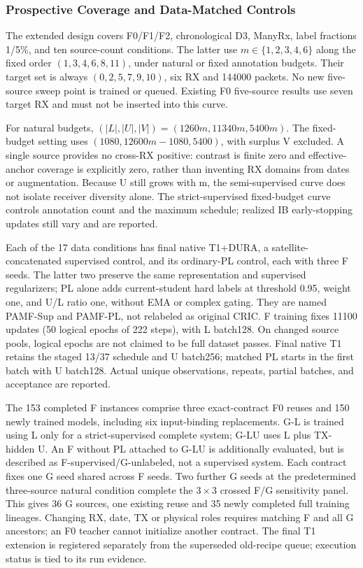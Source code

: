 \subsubsection{Prospective Coverage and Data-Matched Controls}
The extended design covers F0/F1/F2, chronological D3, ManyRx, label fractions 1/5\%, and ten source-count conditions. The latter use $m\in\{1,2,3,4,6\}$ along the fixed order $(1,3,4,6,8,11)$, under natural or fixed annotation budgets. Their target set is always $(0,2,5,7,9,10)$, six RX and 144000 packets. No new five-source sweep point is trained or queued. Existing F0 five-source results use seven target RX and must not be inserted into this curve.

For natural budgets, $(|L|,|U|,|V|)=(1260m,11340m,5400m)$. The fixed-budget setting uses $(1080,12600m-1080,5400)$, with surplus V excluded. A single source provides no cross-RX positive: contrast is finite zero and effective-anchor coverage is explicitly zero, rather than inventing RX domains from dates or augmentation. Because U still grows with m, the semi-supervised curve does not isolate receiver diversity alone. The strict-supervised fixed-budget curve controls annotation count and the maximum schedule; realized IB early-stopping updates still vary and are reported.

Each of the 17 data conditions has final native T1+DURA, a satellite-concatenated supervised control, and its ordinary-PL control, each with three F seeds. The latter two preserve the same representation and supervised regularizers; PL alone adds current-student hard labels at threshold 0.95, weight one, and U/L ratio one, without EMA or complex gating. They are named PAMF-Sup and PAMF-PL, not relabeled as original CRIC. F training fixes 11100 updates (50 logical epochs of 222 steps), with L batch128. On changed source pools, logical epochs are not claimed to be full dataset passes. Final native T1 retains the staged 13/37 schedule and U batch256; matched PL starts in the first batch with U batch128. Actual unique observations, repeats, partial batches, and acceptance are reported.

The 153 completed F instances comprise three exact-contract F0 reuses and 150 newly trained models, including six input-binding replacements. G-L is trained using L only for a strict-supervised complete system; G-LU uses L plus TX-hidden U. An F without PL attached to G-LU is additionally evaluated, but is described as F-supervised/G-unlabeled, not a supervised system. Each contract fixes one G seed shared across F seeds. Two further G seeds at the predetermined three-source natural condition complete the $3\times3$ crossed F/G sensitivity panel. This gives 36 G sources, one existing reuse and 35 newly completed full training lineages. Changing RX, date, TX or physical roles requires matching F and all G ancestors; an F0 teacher cannot initialize another contract. The final T1 extension is registered separately from the superseded old-recipe queue; execution status is tied to its run evidence.

